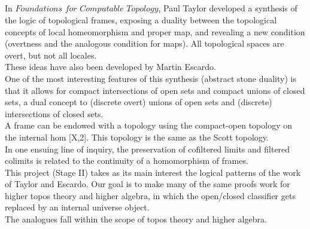 \documentclass{book}
\newcounter{pcounter}
\newcounter{sectioncount}
\newcounter{subsectioncount}
\renewcommand{\section}[1]{\newpage\ \\ \ \\ \begin{center} \scalebox{1.5}{\texttt{\thesectioncount . #1}} \stepcounter{sectioncount} \setcounter{subsectioncount}{1} \end{center} \begin{center} \ \\ \ \\ \thispagestyle{empty} \end{center}}
\begin{document}
\section{\scalebox{0.6}{Stage II: Goals concerning geometric maps in topos theory and stable homotopy}}

In $\textit{Foundations for Computable Topology}$, Paul Taylor developed a synthesis of the logic of topological frames, exposing a duality between the topological concepts of local homeomorphism and proper map, and revealing a new condition (overtness and the analogous condition for maps). All topological spaces are overt, but not all locales.\\

These ideas have also been developed by Martin Escardo.\\

One of the most interesting features of this synthesis (abstract stone duality) is that it allows for compact intersections of open sets and compact unions of closed sets, a dual concept to (discrete overt) unions of open sets and (discrete) intersections of closed sets.\\

A frame can be endowed with a topology using the compact-open topology on the internal hom [X,2]. This topology is the same as the Scott topology.\\

In one ensuing line of inquiry, the preservation of cofiltered limits and filtered colimits is related to the continuity of a homomorphism of frames.\\

This project (Stage II) takes as its main interest the logical patterns of the work of Taylor and Escardo. Our goal is to make many of the same proofs work for higher topos theory and higher algebra, in which the open/closed classifier gets replaced by an internal universe object.\\ 

The analogues fall within the scope of topos theory and higher algebra.\\
\end{document}

